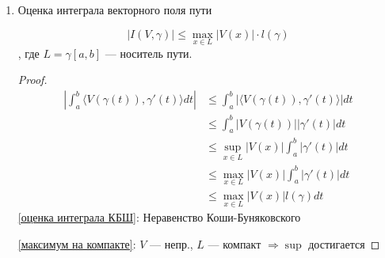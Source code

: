 \begin{enumerate}
	      $\gamma^- : [a, b] \to\R^m, t\mapsto = \gamma(a + b - t)$, т.е. мы идём от $b$ к $a$, а не наоборот.

	      Тогда $I(V, \gamma) = - I(V, \gamma^-)$

	      \begin{proof}
		      \begin{align*}
			      I(V, \gamma^-) & = \int_a^b \langle V(\gamma(a + b - \tau)), -\gamma'(a + b - \tau)\rangle d\tau \\
			      t := a + b - \tau                                                                                \\
			                     & = \int_b^a \langle V(\gamma(t)), -\gamma'(t)\rangle (-dt)                       \\
			                     & = - I(V, \gamma)
		      \end{align*}
	      \end{proof}
	\item Оценка интеграла векторного поля пути

	      $$|I(V, \gamma)| \le \max_{x\in L} |V(x)|\cdot l(\gamma)$$
	      , где $L=\gamma[a, b]$ --- носитель пути.

	      \begin{proof}
		      \begin{align}
			      \left|\int_a^b \langle V(\gamma(t)), \gamma'(t)\rangle dt\right| & \le \int_a^b\left|\langle V(\gamma(t)), \gamma'(t)\rangle \right| dt \nonumber \\
			                                                                       & \le \int_a^b |V(\gamma(t))| |\gamma'(t)| dt  \label{оценка интеграла КБШ}      \\
			                                                                       & \le \sup_{x\in L}|V(x)| \int_a^b |\gamma'(t)| dt                     \nonumber \\
			                                                                       & \le \max_{x\in L}|V(x)| \int_a^b |\gamma'(t)| dt  \label{максимум на компакте} \\
			                                                                       & \le \max_{x\in L}|V(x)| l(\gamma) dt                                 \nonumber
		      \end{align}
		      \ref{оценка интеграла КБШ}: Неравенство Коши-Буняковского

		      \ref{максимум на компакте}: $V$ --- непр., $L$ --- компакт $\Rightarrow \sup$ достигается
	      \end{proof}
\end{enumerate}

